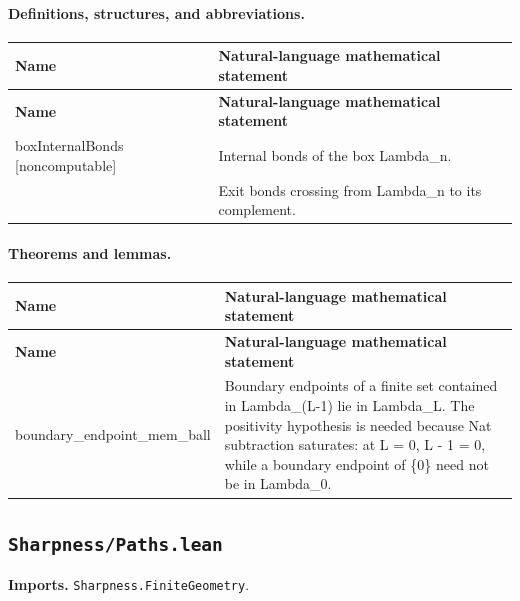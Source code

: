 \documentclass[10pt]{article}
\newcommand{\module}[1]{\texttt{#1}}
\begin{document}
\paragraph{Definitions, structures, and abbreviations.}
\begin{longtable}{>{\raggedright\arraybackslash}p{} >{\raggedright\arraybackslash}p{}}
\textbf{Name} & \textbf{Natural-language mathematical statement} \\
\hline
\endfirsthead
\textbf{Name} & \textbf{Natural-language mathematical statement} \\
\hline
\endhead
{\footnotesize\ttfamily boxInternalBonds [noncomputable]} & Internal bonds of the box Lambda\_n. \\[0.45em]
{\footnotesize\ttfamily boxExitBonds [noncomputable]} & Exit bonds crossing from Lambda\_n to its complement. \\[0.45em]
\end{longtable}

\paragraph{Theorems and lemmas.}
\begin{longtable}{>{\raggedright\arraybackslash}p{} >{\raggedright\arraybackslash}p{}}
\textbf{Name} & \textbf{Natural-language mathematical statement} \\
\hline
\endfirsthead
\textbf{Name} & \textbf{Natural-language mathematical statement} \\
\hline
\endhead
{\footnotesize\ttfamily boundary\_\allowbreak{}endpoint\_\allowbreak{}mem\_\allowbreak{}ball} & Boundary endpoints of a finite set contained in Lambda\_(L-1) lie in Lambda\_L. The positivity hypothesis is needed because Nat subtraction saturates: at L = 0, L - 1 = 0, while a boundary endpoint of \{0\} need not be in Lambda\_0. \\[0.45em]
\end{longtable}

\subsection*{\module{Sharpness/Paths.lean}}
\textbf{Imports.} \module{Sharpness.FiniteGeometry}.
\end{document}
